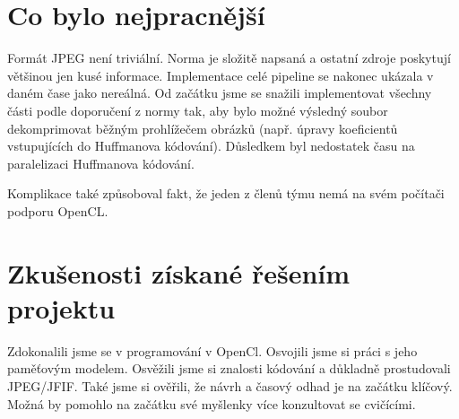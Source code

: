 \documentclass[11pt,a4paper]{article}
\begin{document}
\section{Co bylo nejpracnější}

Formát JPEG není triviální.  Norma \cite{t81} je složitě napsaná a ostatní zdroje poskytují většinou jen kusé informace. Implementace celé pipeline se nakonec ukázala v daném čase jako nereálná. Od začátku jsme se snažili implementovat všechny části podle doporučení z normy tak, aby bylo možné výsledný soubor dekomprimovat běžným prohlížečem obrázků (např. úpravy koeficientů vstupujících do Huffmanova kódování). Důsledkem byl nedostatek času na paralelizaci Huffmanova kódování.

Komplikace také způsoboval fakt, že jeden z členů týmu nemá na svém počítači podporu OpenCL.

\section{Zkušenosti získané řešením projektu}
Zdokonalili jsme se v programování v OpenCl. Osvojili jsme si práci s jeho paměťovým modelem. Osvěžili jsme si znalosti kódování a důkladně prostudovali JPEG/JFIF. Také jsme si ověřili, že návrh a časový odhad  je na začátku klíčový. Možná by pomohlo na začátku své myšlenky více konzultovat se cvičícími.

\end{document}
